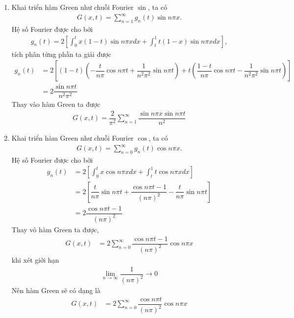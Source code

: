 \documentclass{report}
\newcommand{\f}[2]{\dfrac{#1}{#2}}
\begin{document}
\begin{enumerate}[label=(\alph*)]
	\item Khai triển hàm Green như chuỗi Fourier $\sin$, ta có
	\begin{align*}
		G(x,t) = \sum_{n=1}^{\infty} g_n(t) \sin n\pi x.
	\end{align*}
	Hệ số Fourier được cho bởi
	\begin{align*}
		g_n(t) = 2 \left[ \int_{0}^{t}x(1-t) \sin n\pi x dx + \int_{t}^{1}t(1-x)\sin n\pi x dx \right],
	\end{align*}
	tích phân từng phần ta giải được
	\begin{align*}
		g_n(t) 
		& = 2 \left[ (1-t)\left( -\f{t}{n\pi}\cos n\pi t + \f{1}{n^2 \pi^2} \sin n\pi t\right) + t\left( \f{1-t}{n \pi}\cos n\pi t - \f{1}{n^2\pi^2}\sin n\pi t \right) \right]\\
		& = 2 \f{\sin n\pi t}{n^2 \pi^2}
	\end{align*}
	Thay vào hàm Green ta được
	\begin{align*}
		G(x,t) = \f{2}{\pi^2}\sum_{n=1}^{\infty} \f{\sin n\pi x \sin n\pi t}{n^2}
	\end{align*}
	\item Khai triển hàm Green như chuỗi Fourier $\cos$, ta có
	\begin{align*}
		G(x,t) = \sum_{n = 0}^{\infty} g_n(t) \cos n\pi x.
	\end{align*}
	Hệ số Fourier được cho bởi
	\begin{align*}
		g_n(t) 
		& = 2 \left[ \int_{0}^{t}x \cos n\pi x dx + \int_{t}^{1}t\cos n\pi x dx \right]\\
		& = 2 \left[ \f{t}{n\pi} \sin n\pi t + \f{\cos n\pi t - 1}{(n\pi)^2} - \f{t}{n\pi} \sin n \pi t \right] \\
		& = 2 \f{\cos n\pi t - 1}{(n\pi)^2}
	\end{align*}
	Thay vô hàm Green ta được,
	\begin{align*}
		G(x,t) 
		& = 2\sum_{n = 0}^{\infty} \f{\cos n\pi t - 1}{(n\pi)^2} \cos n\pi x
	\end{align*}
	khi xét giới hạn
	\begin{align*}
		\lim_{n\rightarrow \infty} \f{1}{(n\pi)^2} \rightarrow 0
	\end{align*}
	Nên hàm Green sẽ có dạng là 
	\begin{align*}
		G(x,t) 
		& = 2\sum_{n = 0}^{\infty} \f{\cos n\pi t}{(n\pi)^2} \cos n\pi x
	\end{align*}
\end{enumerate}
\end{document}
